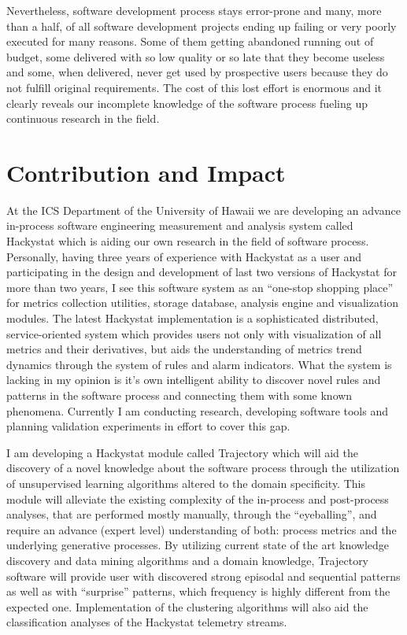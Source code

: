 \documentclass[11pt,oneside]{article}
\begin{document}
Nevertheless, software development process stays error-prone and many, more than a half, of all software development projects ending up failing or very poorly executed for many reasons. Some of them getting abandoned running out of budget, some delivered with so low quality or so late that they become useless and some, when delivered, never get used by prospective users because they do not fulfill original requirements. The cost of this lost effort is enormous and it clearly reveals our incomplete knowledge of the software process fueling up continuous research in the field. 

\section{Contribution and Impact}
At the ICS Department of the University of Hawaii we are developing an advance in-process software engineering measurement and analysis system called Hackystat which is aiding our own research in the field of software process. Personally, having three years of experience with Hackystat as a user and participating in the design and development of last two versions of Hackystat for more than two years, I see this software system as an ``one-stop shopping place'' for metrics collection utilities, storage database, analysis engine and visualization modules. The latest Hackystat implementation is a sophisticated distributed, service-oriented system which provides users not only with visualization of all metrics and their derivatives, but aids the understanding of metrics trend dynamics through the system of rules and alarm indicators. What the system is lacking in my opinion is it's own intelligent ability to discover novel rules and patterns in the software process and connecting them with some known phenomena. Currently I am conducting research, developing software tools and planning validation experiments in effort to cover this gap.

I am developing a Hackystat module called Trajectory which will aid the discovery of a novel knowledge about the software process through the utilization of unsupervised learning algorithms altered to the domain specificity. This module will alleviate the existing complexity of the in-process and post-process analyses, that are performed mostly manually, through the ``eyeballing'', and require an advance (expert level) understanding of both: process metrics and the underlying generative processes. By utilizing current state of the art knowledge discovery and data mining algorithms and a domain knowledge, Trajectory software will provide user with discovered strong episodal and sequential patterns as well as with ``surprise'' patterns, which frequency is highly different from the expected one. Implementation of the clustering algorithms will also aid the classification analyses of the Hackystat telemetry streams.
\end{document}
